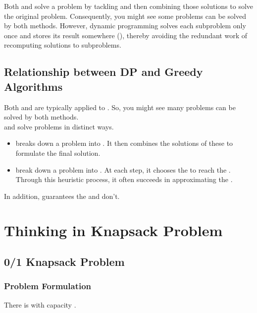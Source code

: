 Both {\color{blue}{dynamic programming}} and {\color{blue}{recursion}} solve a problem by tackling {\color{blue}{smaller versions of the same problem}} and then combining those solutions to solve the original problem. Consequently, you might see some problems can be solved by both methods. However, dynamic programming solves each subproblem only once and stores its result somewhere ({\color{blue}{memorization}}), thereby avoiding the redundant work of recomputing solutions to subproblems.

\subsection{Relationship between DP and Greedy Algorithms}\label{subsec:relationship_between_dp_greedy}
Both {\color{blue}{dynamic programming}} and {\color{blue}{greedy algorithms}} are typically applied to {\color{blue}{optimization problems}}. So, you might see many problems can be solved by both methods. \\

{\color{blue}{Dynamic programming}} and {\color{blue}{greedy algorithms}} solve problems in distinct ways.
\begin{itemize}
	\item {\color{blue}{Dynamic programming}} breaks down a problem into {\color{blue}{smaller versions of the same problem}}. It then combines the solutions of these {\color{blue}{subproblems}} to formulate the final solution.
	\item {\color{blue}{Greedy algorithms}} break down a problem into {\color{blue}{a sequence of consistent steps}}. At each step, it chooses the {\color{blue}{greedy choice}} to reach the {\color{blue}{local optimum}}. Through this heuristic process, it often succeeds in approximating the {\color{blue}{global optimum}}.
\end{itemize}

In addition, {\color{blue}{dynamic programming}} guarantees the {\color{blue}{global optimum}} and {\color{blue}{greedy algorithms}} don't. 

\section{Thinking in Knapsack Problem}
\subsection{0/1 Knapsack Problem}
\subsubsection{Problem Formulation}
There is {\color{blue}{a knapsack}} with capacity {\color{blue}{$W$}}. \\

